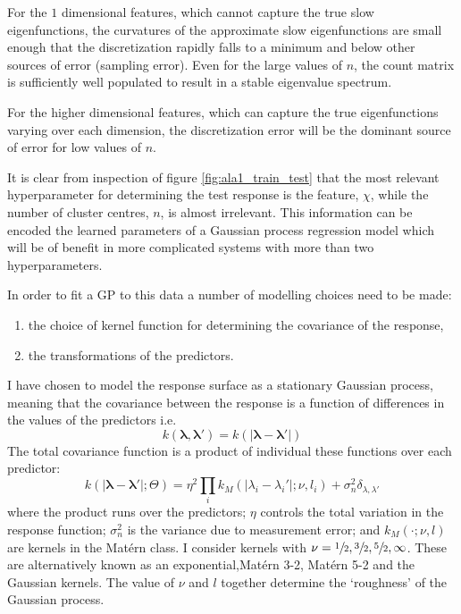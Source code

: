For the $1$ dimensional features, which cannot capture the true slow eigenfunctions, the curvatures of the approximate slow eigenfunctions are small enough that the discretization rapidly falls to a minimum and below other sources of error (sampling error). Even for the large values of $n$, the count matrix is sufficiently well populated to result in a stable eigenvalue spectrum. 

For the higher dimensional features, which can capture the true eigenfunctions varying over each dimension, the discretization error will be the dominant source of error for low values of $n$. 



It is clear from inspection of figure \ref{fig:ala1_train_test} that the most relevant hyperparameter for determining the test response is the feature, $\chi$, while the number of cluster centres,  $n$, is almost irrelevant. This information can be encoded the learned parameters of a Gaussian process regression model which will be of benefit in more complicated systems with more than two hyperparameters. 

In order to fit a GP to this data a number of modelling choices need to be made: 
\begin{enumerate}
    \item the choice of kernel function for determining the covariance of the response,
    \item the transformations of the predictors.  
\end{enumerate}

I have chosen to model the response surface as a stationary Gaussian process, meaning that the covariance between the response is a function of differences in the values of the predictors i.e. 
\begin{equation}
k(\mathbf{\lambda}, \mathbf{\lambda'}) = k(|\mathbf{\lambda} - \mathbf{\lambda'}|)
\end{equation}
The total covariance function is a product of individual these functions over each predictor:
\begin{equation}\label{eqn:kernel_form}
    k(|\mathbf{\lambda}-\mathbf{\lambda}'|; \Theta) = 
    \eta^{2}\prod_i k_{M}(|\lambda_{i}-\lambda_{i}'|; \nu, l_i)
    +\sigma_{n}^{2}\delta_{\lambda, \lambda'}
\end{equation}
where  the product runs over the predictors; $\eta$ controls the total variation in the response function; $\sigma_{n}^{2}$ is the variance due to measurement error; and  $k_{M}(\cdot; \nu, l)$ are kernels in the Mat\'{e}rn class. I consider kernels with $\nu=\sfrac{1}{2},\sfrac{3}{2},\sfrac{5}{2},\infty$. These are alternatively known as an exponential,Mat\'{e}rn 3-2, Mat\'{e}rn 5-2 and the Gaussian kernels. The value of $\nu$ and $l$ together determine the `roughness' of the Gaussian process. 

